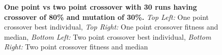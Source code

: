 \documentclass[a4paper, 12pt]{article}
\begin{document}
\begin{figure}[h!]
	\caption
	{	
		\textbf{One point vs two point crossover with 30 runs having crossover of 80\% and mutation of 30\%.}\newline
		\textit{Top Left:} One point crossover best individual,
		\textit{Top Right:} One point crossover fitness and median, 
		\textit{Bottom Left:} Two point crossover best individual, 
		\textit{Bottom Right:} Two point crossover fitness and median
	}
\end{figure}
\end{document}
